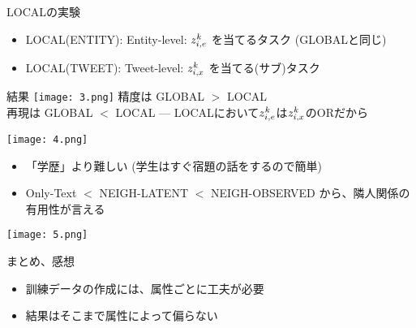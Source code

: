\documentclass[12pt, dvipdfmx, default, cjk]{beamer}
\begin{document}
\begin{frame}{LOCALの実験}
  \begin{itemize}
    \item LOCAL(ENTITY): Entity-level: $z^k_{i,e}$ を当てるタスク (GLOBALと同じ)
    \item LOCAL(TWEET): Tweet-level: $z^k_{i,x}$ を当てる(サブ)タスク
  \end{itemize}
\end{frame}

\begin{frame}{結果}
  \texttt{[image: 3.png]}
  精度は GLOBAL $>$ LOCAL \\
  再現は GLOBAL $<$ LOCAL --- LOCALにおいて$z^k_{i,e}$は$z^k_{i,x}$のORだから
\end{frame}

\begin{frame}
  \texttt{[image: 4.png]}
  \begin{itemize}
    \item 「学歴」より難しい (学生はすぐ宿題の話をするので簡単)
    \item Only-Text $<$ NEIGH-LATENT $<$ NEIGH-OBSERVED から、隣人関係の有用性が言える
  \end{itemize}
\end{frame}

\begin{frame}
\texttt{[image: 5.png]}
\end{frame}

\begin{frame}{まとめ、感想}
  \begin{itemize}
    \item 訓練データの作成には、属性ごとに工夫が必要
    \item 結果はそこまで属性によって偏らない
  \end{itemize}
\end{frame}
\end{document}
